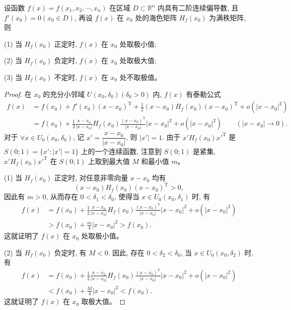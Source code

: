 \documentclass[12pt,fontset=fandol]{ctexart}
\begin{document}
\begin{theorem}\label{course-theorem-14-5-2}\quad 设函数 $f(x)=f(x_1,x_2,\cdots,x_n)$ 在区域 $D\subset\mathbb R^n$ 内具有二阶连续偏导数, 且 $f'(x_0)=0(x_0\in D)$, 再设 $f(x)$ 在 $x_0$ 处的海色矩阵 $H_f(x_0)$ 为满秩矩阵, 则

\noindent (1) 当 $H_f(x_0)$ 正定时, $f(x)$ 在 $x_0$ 处取极小值;

\noindent (2) 当 $H_f(x_0)$ 负定时, $f(x)$ 在 $x_0$ 处取极大值;

\noindent (3) 当 $H_f(x_0)$ 不定时, $f(x)$ 在 $x_0$ 处不取极值。

\end{theorem}
\begin{proof}\quad 在 $x_0$ 的充分小邻域 $U(x_0,\delta_0)(\delta_0>0)$ 内, $f(x)$ 有泰勒公式
\[
\begin{aligned}
  f(x)
  &=f(x_0)+f'(x_0)(x-x_0)^{\mathrm T}
    +\frac12(x-x_0)H_f(x_0)(x-x_0)^{\mathrm T}
    +o(|x-x_0|^2)\\
  &=f(x_0)+\frac12
    \frac{x-x_0}{|x-x_0|}
    H_f(x_0)
    \frac{(x-x_0)^{\mathrm T}}{|x-x_0|}
    |x-x_0|^2
    +o(|x-x_0|^2)
    \qquad (|x-x_0|\to0).
\end{aligned}
\]
对于 $\forall x\in U_0(x_0,\delta_0)$, 记 $x'=\dfrac{x-x_0}{|x-x_0|}$, 则 $|x'|=1$. 由于 $x'H_f(x_0)x'^{\mathrm T}$ 是 $S(0;1)=\{x':|x'|=1\}$ 上的一个连续函数, 注意到 $S(0;1)$ 是紧集, $x'H_f(x_0)x'^{\mathrm T}$ 在 $S(0;1)$ 上取到最大值 $M$ 和最小值 $m$。

\noindent (1) 当 $H_f(x_0)$ 正定时, 对任意非零向量 $x-x_0$ 均有
\[
  (x-x_0)H_f(x_0)(x-x_0)^{\mathrm T}>0,
\]
因此有 $m>0$, 从而存在 $0<\delta_1<\delta_0$, 使得当 $x\in U_0(x_0,\delta_1)$ 时, 有
\[
\begin{aligned}
  f(x)
  &=f(x_0)+\frac12
    \frac{x-x_0}{|x-x_0|}
    H_f(x_0)
    \frac{(x-x_0)^{\mathrm T}}{|x-x_0|}
    |x-x_0|^2+o(|x-x_0|^2)\\
  &>f(x_0)+\frac m4|x-x_0|^2>f(x_0).
\end{aligned}
\]
这就证明了 $f(x)$ 在 $x_0$ 处取极小值。

\noindent (2) 当 $H_f(x_0)$ 负定时, 有 $M<0$. 因此, 存在 $0<\delta_2<\delta_0$, 当 $x\in U_0(x_0,\delta_2)$ 时, 有
\[
\begin{aligned}
  f(x)
  &=f(x_0)+\frac12
    \frac{x-x_0}{|x-x_0|}
    H_f(x_0)
    \frac{(x-x_0)^{\mathrm T}}{|x-x_0|}
    |x-x_0|^2+o(|x-x_0|^2)\\
  &<f(x_0)+\frac M4|x-x_0|^2<f(x_0).
\end{aligned}
\]
这就证明了 $f(x)$ 在 $x_0$ 取极大值。


\end{proof}
\end{document}
